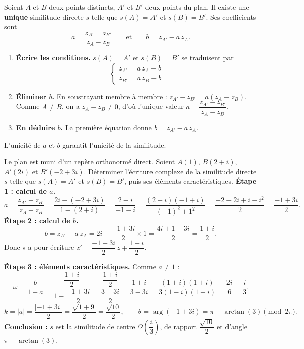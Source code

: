 \documentclass[11pt]{article}
\begin{document}
\begin{propriete}
Soient $A$ et $B$ deux points distincts, $A'$ et $B'$ deux points du plan. Il existe une \textbf{unique} similitude directe $s$ telle que $s(A) = A'$ et $s(B) = B'$. Ses coefficients sont
\[ a = \frac{z_{A'} - z_{B'}}{z_A - z_B} \qquad \text{et} \qquad b = z_{A'} - a\,z_A. \]
\end{propriete}

\begin{experience}
\begin{enumerate}
\item \textbf{Écrire les conditions.} $s(A) = A'$ et $s(B) = B'$ se traduisent par
\[ \begin{cases} z_{A'} = a\,z_A + b \\ z_{B'} = a\,z_B + b \end{cases} \]
\item \textbf{Éliminer $b$.} En soustrayant membre à membre : $z_{A'} - z_{B'} = a(z_A - z_B)$. Comme $A \neq B$, on a $z_A - z_B \neq 0$, d'où l'unique valeur $a = \dfrac{z_{A'} - z_{B'}}{z_A - z_B}$.
\item \textbf{En déduire $b$.} La première équation donne $b = z_{A'} - a\,z_A$.
\end{enumerate}
L'unicité de $a$ et $b$ garantit l'unicité de la similitude.
\end{experience}

\begin{exoresolu}
Le plan est muni d'un repère orthonormé direct. Soient $A(1)$, $B(2 + i)$, $A'(2i)$ et $B'(-2 + 3i)$. Déterminer l'écriture complexe de la similitude directe $s$ telle que $s(A) = A'$ et $s(B) = B'$, puis ses éléments caractéristiques.
\tcblower
\textbf{Étape 1 : calcul de $a$.}
\[ a = \frac{z_{A'} - z_{B'}}{z_A - z_B} = \frac{2i - (-2 + 3i)}{1 - (2 + i)} = \frac{2 - i}{-1 - i} = \frac{(2 - i)(-1 + i)}{(-1)^2 + 1^2} = \frac{-2 + 2i + i - i^2}{2} = \frac{-1 + 3i}{2}. \]
\textbf{Étape 2 : calcul de $b$.}
\[ b = z_{A'} - a\,z_A = 2i - \frac{-1 + 3i}{2} \times 1 = \frac{4i + 1 - 3i}{2} = \frac{1 + i}{2}. \]
Donc $s$ a pour écriture $z' = \dfrac{-1 + 3i}{2}\,z + \dfrac{1 + i}{2}$.

\textbf{Étape 3 : éléments caractéristiques.} Comme $a \neq 1$ :
\[ \omega = \frac{b}{1 - a} = \frac{\dfrac{1+i}{2}}{1 - \dfrac{-1+3i}{2}} = \frac{\dfrac{1+i}{2}}{\dfrac{3 - 3i}{2}} = \frac{1 + i}{3 - 3i} = \frac{(1+i)(1+i)}{3(1-i)(1+i)} = \frac{2i}{6} = \frac{i}{3}. \]
\[ k = |a| = \frac{|-1 + 3i|}{2} = \frac{\sqrt{1 + 9}}{2} = \frac{\sqrt{10}}{2}, \qquad \theta = \arg(-1 + 3i) = \pi - \arctan(3) \pmod{2\pi}. \]
\textbf{Conclusion :} $s$ est la similitude de centre $\Omega\left(\dfrac{i}{3}\right)$, de rapport $\dfrac{\sqrt{10}}{2}$ et d'angle $\pi - \arctan(3)$.
\end{exoresolu}
\end{document}
